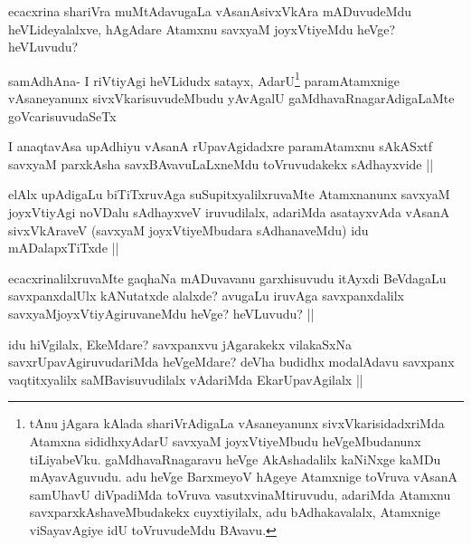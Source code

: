 
\begin{artha}
ecacxrina shariVra muMtAdavugaLa vAsanAsivxVkAra mADuvudeMdu heVLideyalalxve, hAgAdare Atamxnu savxyaM joyxVtiyeMdu heVge? heVLuvudu?
\end{artha}

\begin{artha}
samAdhAna- I riVtiyAgi heVLidudx satayx, AdarU\footnote[2]{tAnu jAgara kAlada shariVrAdigaLa vAsaneyanunx sivxVkarisidadxriMda Atamxna sididhxyAdarU savxyaM joyxVtiyeMbudu heVgeMbudanunx tiLiyabeVku. gaMdhavaRnagaravu heVge AkAshadalilx kaNiNxge kaMDu mAyavAguvudu. adu heVge BarxmeyoV hAgeye Atamxnige toVruva vAsanA samUhavU diVpadiMda toVruva vasutxvinaMtiruvudu, adariMda Atamxnu savxparxkAshaveMbudakekx cuyxtiyilalx, adu bAdhakavalalx, Atamxnige viSayavAgiye idU toVruvudeMdu BAvavu.} paramAtamxnige vAsaneyanunx sivxVkarisuvudeMbudu yAvAgalU gaMdhavaRnagarAdigaLaMte goVcarisuvudaSeTx
\end{artha}


\begin{artha}
I anaqtavAsa upAdhiyu vAsanA rUpavAgidadxre paramAtamxnu sAkASxtf savxyaM parxkAsha savxBAvavuLaLxneMdu toVruvudakekx sAdhayxvide ||
\end{artha}


\begin{artha}
elAlx upAdigaLu biTiTxruvAga suSupitxyalilxruvaMte Atamxnanunx savxyaM joyxVtiyAgi noVDalu sAdhayxveV iruvudilalx, adariMda asatayxvAda vAsanA sivxVkAraveV (savxyaM joyxVtiyeMbudara sAdhanaveMdu) idu mADalapxTiTxde ||
\end{artha}


\begin{artha}
ecacxrinalilxruvaMte gaqhaNa mADuvavanu garxhisuvudu itAyxdi BeVdagaLu savxpanxdalUlx kANutatxde alalxde? avugaLu iruvAga savxpanxdalilx savxyaMjoyxVtiyAgiruvaneMdu heVge? heVLuvudu? ||
\end{artha}


\begin{artha}
idu hiVgilalx, EkeMdare? savxpanxvu jAgarakekx vilakaSxNa savxrUpavAgiruvudariMda heVgeMdare? deVha budidhx modalAdavu savxpanx vaqtitxyalilx saMBavisuvudilalx vAdariMda EkarUpavAgilalx ||
\end{artha}


